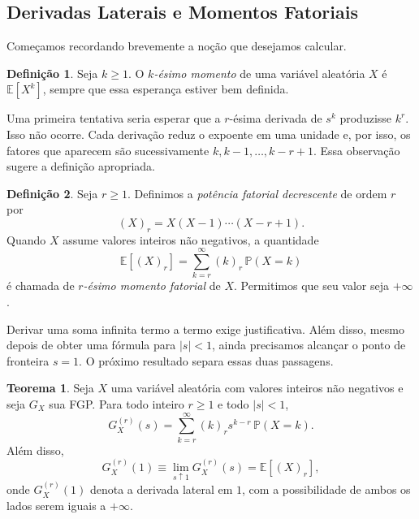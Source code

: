 \documentclass[12pt,portuguese]{article}
\theoremstyle{definition}
\newtheorem{theorem}{Teorema}
\newtheorem{definition}[definition]{Definição}
\theoremstyle{plainexercise}
\theoremstyle{starredexercise}
\theoremstyle{definition}
\begin{document}
\subsection{Derivadas Laterais e Momentos Fatoriais}
\label{sec:momentos-fatoriais}

Começamos recordando brevemente a noção que desejamos calcular.

\begin{definition}\label{def:momento}
Seja $k\geqslant 1$. O \emph{$k$-ésimo momento} de uma variável aleatória
$X$ é $\mathbb{E}[X^k]$, sempre que essa esperança estiver bem definida.
\end{definition}

Uma primeira tentativa seria esperar que a $r$-ésima derivada de $s^k$
produzisse $k^r$. Isso não ocorre. Cada derivação reduz o expoente em uma
unidade e, por isso, os fatores que aparecem são sucessivamente
$k,k-1,\ldots,k-r+1$. Essa observação sugere a definição apropriada.

\begin{definition}\label{def:momento-fatorial}
Seja $r\geqslant 1$. Definimos a \emph{potência fatorial decrescente} de ordem
$r$ por
\[
(X)_r=X(X-1)\cdots(X-r+1).
\]
Quando $X$ assume valores inteiros não negativos, a quantidade
\[
\mathbb{E}[(X)_r]
=\sum_{k=r}^{\infty}(k)_r\,\mathbb{P}(X=k)
\]
é chamada de \emph{$r$-ésimo momento fatorial} de $X$. Permitimos que seu
valor seja $+\infty$.
\end{definition}

Derivar uma soma infinita termo a termo exige justificativa. Além disso, mesmo
depois de obter uma fórmula para $|s|<1$, ainda precisamos alcançar o ponto de
fronteira $s=1$. O próximo resultado separa essas duas passagens.

\begin{theorem}\label{thm:derivadas-fgp-momentos-fatoriais}
Seja $X$ uma variável aleatória com valores inteiros não negativos e seja
$G_X$ sua FGP. Para todo inteiro $r\geqslant 1$ e todo $|s|<1$,
\begin{equation}\label{eq:derivada-fgp}
G_X^{(r)}(s)
=\sum_{k=r}^{\infty}(k)_r s^{k-r}\,\mathbb{P}(X=k).
\end{equation}
Além disso,
\[
G_X^{(r)}(1)
\equiv\lim_{s\uparrow 1}G_X^{(r)}(s)
=\mathbb{E}[(X)_r],
\]
onde $G_X^{(r)}(1)$ denota a derivada lateral em $1$, com a possibilidade de
ambos os lados serem iguais a $+\infty$.
\end{theorem}
\end{document}
